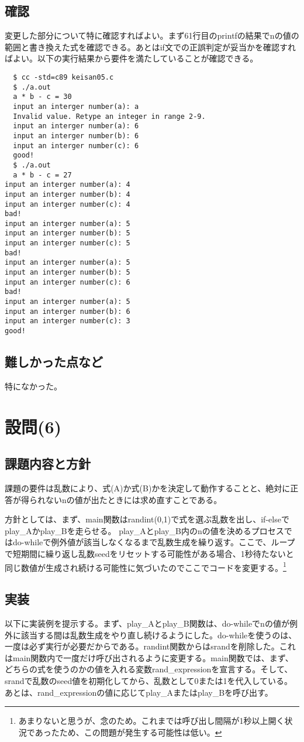 \documentclass[dvipdfmx,12pt,a4j]{jarticle}
\begin{document}
\subsection{確認}
変更した部分について特に確認すればよい。まず61行目のprintfの結果でnの値の範囲と書き換えた式を確認できる。あとはif文での正誤判定が妥当かを確認すればよい。以下の実行結果から要件を満たしていることが確認できる。
\begin{verbatim}
  $ cc -std=c89 keisan05.c
  $ ./a.out
  a * b - c = 30
  input an interger number(a): a
  Invalid value. Retype an integer in range 2-9.
  input an interger number(a): 6
  input an interger number(b): 6
  input an interger number(c): 6
  good!
  $ ./a.out
  a * b - c = 27
input an interger number(a): 4
input an interger number(b): 4
input an interger number(c): 4
bad!
input an interger number(a): 5
input an interger number(b): 5
input an interger number(c): 5
bad!
input an interger number(a): 5
input an interger number(b): 5
input an interger number(c): 6
bad!
input an interger number(a): 5
input an interger number(b): 6
input an interger number(c): 3
good!
\end{verbatim}
\subsection{難しかった点など}
特になかった。

\section{設問(6)}
\subsection{課題内容と方針}
課題の要件は乱数により、式(A)か式(B)かを決定して動作することと、絶対に正答が得られないnの値が出たときには求め直すことである。

方針としては、まず、main関数はrandint(0,1)で式を選ぶ乱数を出し、if-elseでplay\_Aかplay\_Bを走らせる。
play\_Aとplay\_B内のnの値を決めるプロセスではdo-whileで例外値が該当しなくなるまで乱数生成を繰り返す。ここで、ループで短期間に繰り返し乱数seedをリセットする可能性がある場合、1秒待たないと同じ数値が生成され続ける可能性に気づいたのでここでコードを変更する。\footnote{あまりないと思うが、念のため。これまでは呼び出し間隔が1秒以上開く状況であったため、この問題が発生する可能性は低い。}

\subsection{実装}
以下に実装例を提示する。まず、play\_Aとplay\_B関数は、do-whileでnの値が例外に該当する間は乱数生成をやり直し続けるようにした。do-whileを使うのは、一度は必ず実行が必要だからである。randint関数からはsrandを削除した。これはmain関数内で一度だけ呼び出されるように変更する。main関数では、まず、どちらの式を使うのかの値を入れる変数rand\_expressionを宣言する。そして、srandで乱数のseed値を初期化してから、乱数として0または1を代入している。あとは、rand\_expressionの値に応じてplay\_Aまたはplay\_Bを呼び出す。

\end{document}
